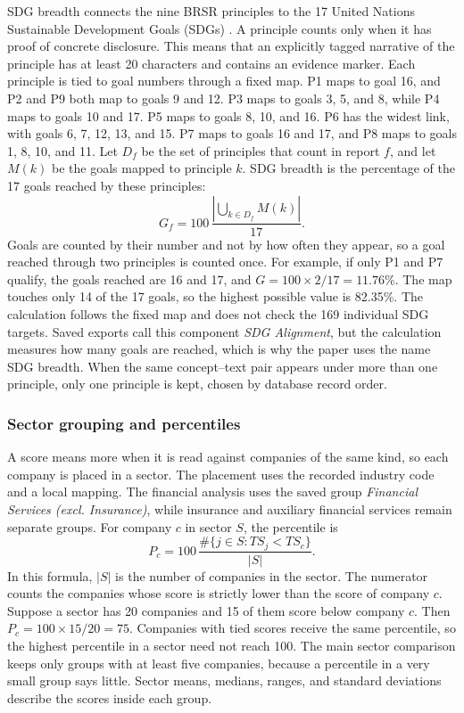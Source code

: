 SDG breadth connects the nine BRSR principles to the 17 United Nations Sustainable Development Goals (SDGs) \cite{un2015}. A principle counts only when it has proof of concrete disclosure. This means that an explicitly tagged narrative of the principle has at least 20 characters and contains an evidence marker. Each principle is tied to goal numbers through a fixed map. P1 maps to goal 16, and P2 and P9 both map to goals 9 and 12. P3 maps to goals 3, 5, and 8, while P4 maps to goals 10 and 17. P5 maps to goals 8, 10, and 16. P6 has the widest link, with goals 6, 7, 12, 13, and 15. P7 maps to goals 16 and 17, and P8 maps to goals 1, 8, 10, and 11. Let $D_f$ be the set of principles that count in report $f$, and let $M(k)$ be the goals mapped to principle $k$. SDG breadth is the percentage of the 17 goals reached by these principles:
\begin{equation}
G_f=100\,\frac{\left|\bigcup_{k\in D_f}M(k)\right|}{17}.
\label{eq:sdg}
\end{equation}
Goals are counted by their number and not by how often they appear, so a goal reached through two principles is counted once. For example, if only P1 and P7 qualify, the goals reached are 16 and 17, and $G=100\times2/17=11.76\%$. The map touches only 14 of the 17 goals, so the highest possible value is 82.35\%. The calculation follows the fixed map and does not check the 169 individual SDG targets. Saved exports call this component \emph{SDG Alignment}, but the calculation measures how many goals are reached, which is why the paper uses the name SDG breadth. When the same concept--text pair appears under more than one principle, only one principle is kept, chosen by database record order.

\subsubsection{Sector grouping and percentiles}

A score means more when it is read against companies of the same kind, so each company is placed in a sector. The placement uses the recorded industry code and a local mapping. The financial analysis uses the saved group \emph{Financial Services (excl. Insurance)}, while insurance and auxiliary financial services remain separate groups. For company $c$ in sector $S$, the percentile is
\begin{equation}
P_c=100\,\frac{\#\{j\in S:TS_j<TS_c\}}{|S|}.
\label{eq:percentile}
\end{equation}
In this formula, $|S|$ is the number of companies in the sector. The numerator counts the companies whose score is strictly lower than the score of company $c$. Suppose a sector has 20 companies and 15 of them score below company $c$. Then $P_c=100\times15/20=75$. Companies with tied scores receive the same percentile, so the highest percentile in a sector need not reach 100. The main sector comparison keeps only groups with at least five companies, because a percentile in a very small group says little. Sector means, medians, ranges, and standard deviations describe the scores inside each group.

